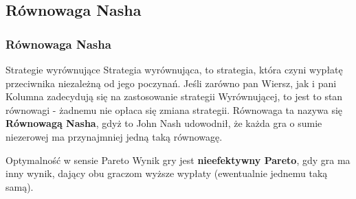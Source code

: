 \documentclass[8pt, brown]{beamer}
\begin{document}
		
		\subsection{Równowaga Nasha}
		\begin{frame}
			\frametitle{Równowaga Nasha}
			\begin{block}{Strategie wyrównujące}
				Strategia wyrównująca, to strategia, która czyni wypłatę przeciwnika niezależną od jego poczynań.
				Jeśli zarówno pan Wiersz, jak i pani Kolumna zadecydują się na zastosowanie strategii Wyrównującej, to jest to stan równowagi - żadnemu nie opłaca się zmiana strategii. Równowaga ta nazywa się \textbf{Równowagą Nasha}, gdyż to John Nash udowodnił, że każda gra o sumie niezerowej ma przynajmniej jedną taką równowagę.
			\end{block}
			\pause
			\begin{block}{Optymalność w sensie Pareto}
				Wynik gry jest \textbf{nieefektywny Pareto}, gdy gra ma inny wynik, dający obu graczom wyższe wypłaty (ewentualnie jednemu taką samą).
			\end{block}
 		\end{frame}
\end{document}
